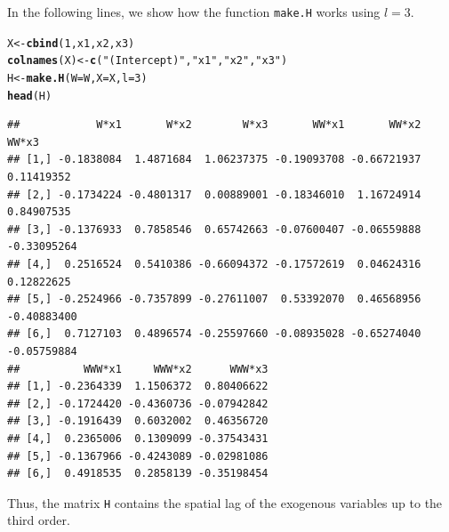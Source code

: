 \documentclass[english,12pt]{book}\usepackage[]{graphicx}\usepackage[]{xcolor}
\makeatletter
\newcommand{\hlnum}[1]{\textcolor[rgb]{0.686,0.059,0.569}{#1}}%
\newcommand{\hlstr}[1]{\textcolor[rgb]{0.192,0.494,0.8}{#1}}%
\newcommand{\hlstd}[1]{\textcolor[rgb]{0.345,0.345,0.345}{#1}}%
\newcommand{\hlkwb}[1]{\textcolor[rgb]{0.69,0.353,0.396}{#1}}%
\newcommand{\hlkwc}[1]{\textcolor[rgb]{0.333,0.667,0.333}{#1}}%
\newcommand{\hlkwd}[1]{\textcolor[rgb]{0.737,0.353,0.396}{\textbf{#1}}}%
\newenvironment{kframe}{%
 \def\at@end@of@kframe{}%
 \ifinner\ifhmode%
  \def\at@end@of@kframe{\end{minipage}}%
  \begin{minipage}{\columnwidth}%
 \fi\fi%
 \def\FrameCommand##1{\hskip\@totalleftmargin \hskip-\fboxsep
 \colorbox{shadecolor}{##1}\hskip-\fboxsep
     \hskip-\linewidth \hskip-\@totalleftmargin \hskip\columnwidth}%
 \MakeFramed {\advance\hsize-\width
   \@totalleftmargin\z@ \linewidth\hsize
   \@setminipage}}%
 {\par\unskip\endMakeFramed%
 \at@end@of@kframe}
\newenvironment{knitrout}{}{} %
\makeatother
\begin{document}
In the following lines, we show how the function \texttt{make.H} works using $l = 3$. 
\begin{knitrout}
\color{fgcolor}\begin{kframe}
\begin{alltt}
\hlstd{X} \hlkwb{<-} \hlkwd{cbind}\hlstd{(}\hlnum{1}\hlstd{, x1, x2, x3)}
\hlkwd{colnames}\hlstd{(X)} \hlkwb{<-} \hlkwd{c}\hlstd{(}\hlstr{"(Intercept)"}\hlstd{,} \hlstr{"x1"}\hlstd{,} \hlstr{"x2"}\hlstd{,} \hlstr{"x3"}\hlstd{)}
\hlstd{H} \hlkwb{<-} \hlkwd{make.H}\hlstd{(}\hlkwc{W} \hlstd{= W,} \hlkwc{X} \hlstd{= X,} \hlkwc{l} \hlstd{=} \hlnum{3}\hlstd{)}
\hlkwd{head}\hlstd{(H)}
\end{alltt}
\begin{verbatim}
##            W*x1       W*x2        W*x3       WW*x1       WW*x2       WW*x3
## [1,] -0.1838084  1.4871684  1.06237375 -0.19093708 -0.66721937  0.11419352
## [2,] -0.1734224 -0.4801317  0.00889001 -0.18346010  1.16724914  0.84907535
## [3,] -0.1376933  0.7858546  0.65742663 -0.07600407 -0.06559888 -0.33095264
## [4,]  0.2516524  0.5410386 -0.66094372 -0.17572619  0.04624316  0.12822625
## [5,] -0.2524966 -0.7357899 -0.27611007  0.53392070  0.46568956 -0.40883400
## [6,]  0.7127103  0.4896574 -0.25597660 -0.08935028 -0.65274040 -0.05759884
##          WWW*x1     WWW*x2      WWW*x3
## [1,] -0.2364339  1.1506372  0.80406622
## [2,] -0.1724420 -0.4360736 -0.07942842
## [3,] -0.1916439  0.6032002  0.46356720
## [4,]  0.2365006  0.1309099 -0.37543431
## [5,] -0.1367966 -0.4243089 -0.02981086
## [6,]  0.4918535  0.2858139 -0.35198454
\end{verbatim}
\end{kframe}
\end{knitrout}

Thus, the matrix \texttt{H} contains the spatial lag of the exogenous variables up to the third order. 
\end{document}
